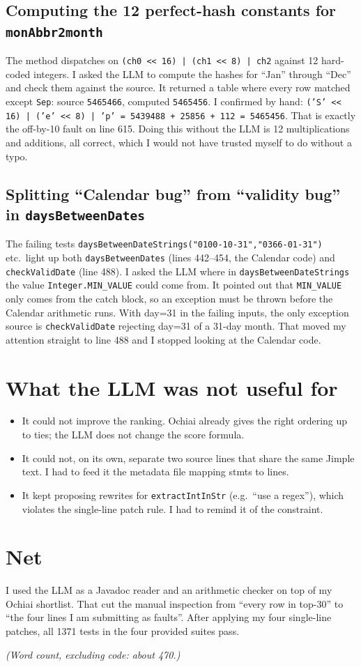\documentclass[manuscript,review,nonacm]{acmart}
\begin{document}
\subsection{Computing the 12 perfect-hash constants for
\texttt{monAbbr2month}}
The method dispatches on \texttt{(ch0 << 16) | (ch1 << 8) | ch2}
against 12 hard-coded integers. I asked the LLM to compute the hashes
for ``Jan'' through ``Dec'' and check them against the source. It
returned a table where every row matched except \texttt{Sep}: source
\texttt{5465466}, computed \texttt{5465456}. I confirmed by hand:
\texttt{('S' << 16) | ('e' << 8) | 'p' = 5439488 + 25856 + 112 =
5465456}. That is exactly the off-by-10 fault on line 615. Doing this
without the LLM is 12 multiplications and additions, all correct,
which I would not have trusted myself to do without a typo.

\subsection{Splitting ``Calendar bug'' from ``validity bug'' in
\texttt{daysBetweenDates}}
The failing tests
\texttt{daysBetweenDateStrings("0100-10-31","0366-01-31")} etc.\ light
up both \texttt{daysBetweenDates} (lines 442--454, the Calendar code)
and \texttt{checkValidDate} (line 488). I asked the LLM where in
\texttt{daysBetweenDateStrings} the value \texttt{Integer.MIN\_VALUE}
could come from. It pointed out that \texttt{MIN\_VALUE} only comes
from the catch block, so an exception must be thrown before the
Calendar arithmetic runs. With day=31 in the failing inputs, the only
exception source is \texttt{checkValidDate} rejecting day=31 of a
31-day month. That moved my attention straight to line 488 and I
stopped looking at the Calendar code.

\section{What the LLM was not useful for}
\begin{itemize}
\item It could not improve the ranking. Ochiai already gives the
      right ordering up to ties; the LLM does not change the score
      formula.
\item It could not, on its own, separate two source lines that share
      the same Jimple text. I had to feed it the metadata file mapping
      stmts to lines.
\item It kept proposing rewrites for \texttt{extractIntInStr} (e.g.\
      ``use a regex''), which violates the single-line patch rule. I
      had to remind it of the constraint.
\end{itemize}

\section{Net}
I used the LLM as a Javadoc reader and an arithmetic checker on top
of my Ochiai shortlist. That cut the manual inspection from ``every
row in top-30'' to ``the four lines I am submitting as faults''.
After applying my four single-line patches, all 1371 tests in the
four provided suites pass.

\noindent\textit{(Word count, excluding code: about 470.)}
\end{document}
